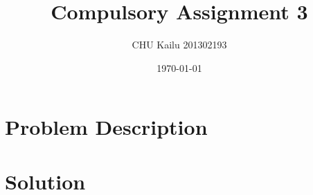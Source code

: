 \documentclass[10pt]{article}
\title{Compulsory Assignment 3}
\author{CHU Kailu 201302193}
\date{\today}
\begin{document}
\maketitle

\section{Problem Description}


\section{Solution}
\end{document}
